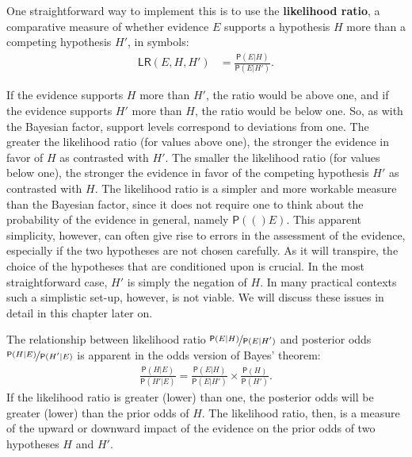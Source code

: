 \documentclass[10pt,dvipsnames,enabledeprecatedfontcommands]{scrartcl}
\newcommand{\pr}[1]{\mathsf{P}(#1)}
\begin{document}
One straightforward way to implement this is to use the
\textbf{likelihood ratio}, a comparative measure of whether evidence
\(E\) supports a hypothesis \(H\) more than a competing hypothesis
\(H'\), in symbols: \begin{align}
\label{eq:LR}
\mathsf{LR}(E,H,H') & = \frac{\pr{E \vert H}}{\pr{E \vert H'}}.
\end{align}

If the evidence supports \(H\) more than \(H'\), the ratio would be
above one, and if the evidence supports \(H'\) more than \(H\), the
ratio would be below one. So, as with the Bayesian factor, support
levels correspond to deviations from one. The greater the likelihood
ratio (for values above one), the stronger the evidence in favor of
\(H\) as contrasted with \(H'\). The smaller the likelihood ratio (for
values below one), the stronger the evidence in favor of the competing
hypothesis \(H'\) as contrasted with \(H\). The likelihood ratio is a
simpler and more workable measure than the Bayesian factor, since it
does not require one to think about the probability of the evidence in
general, namely \(\pr(E)\). This apparent simplicity, however, can often
give rise to errors in the assessment of the evidence, especially if the
two hypotheses are not chosen carefully. As it will transpire, the
choice of the hypotheses that are conditioned upon is crucial. In the
most straightforward case, \(H'\) is simply the negation of \(H\). In
many practical contexts such a simplistic set-up, however, is not
viable. We will discuss these issues in detail in this chapter later on.

The relationship between likelihood ratio
\(\nicefrac{\pr{E \vert H}}{\pr{E \vert H'}}\) and posterior odds
\(\nicefrac{\pr{H \vert E}}{\pr{H' \vert E}}\) is apparent in the odds
version of Bayes' theorem: \begin{align}\label{eq:BTodds}
\frac{\pr{H \vert E}}{\pr{H' \vert E}}= \frac{\pr{E \vert H}}{\pr{E \vert H'}}\times \frac{\pr{H}}{\pr{H'}}.
\end{align} \noindent If the likelihood ratio is greater (lower) than
one, the posterior odds will be greater (lower) than the prior odds of
\(H\). The likelihood ratio, then, is a measure of the upward or
downward impact of the evidence on the prior odds of two hypotheses
\(H\) and \(H'\).
\end{document}
